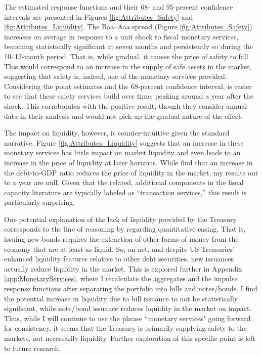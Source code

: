 \documentclass[11pt,a4paper,margin=1.5in]{article}
\begin{document}
The estimated response functions and their 68- and 95-percent confidence intervals are presented in Figures \ref{fig:Attributes_Safety} and \ref{fig:Attributes_Liquidity}.
The Baa--Aaa spread (Figure \ref{fig:Attributes_Safety}) increases on average in response to a unit shock to fiscal monetary services, becoming statistically significant at seven months and persistently so during the 10--12-month period. 
That is, while gradual, it causes the price of safety to fall. 
This would correspond to an increase in the supply of safe assets in the market, suggesting that safety is, indeed, one of the monetary services provided. 
Considering the point estimates and the 68-percent confidence interval, is easier to see that these safety services build over time, peaking around a year after the shock. 
This corroborates with the positive \citet{Krishnamurthy-VissingJorgensen:2012} result, though they consider annual data in their analysis and would not pick up the gradual nature of the effect.

The impact on liquidity, however, is counter-intuitive given the standard narrative.
Figure \ref{fig:Attributes_Liquidity} suggests that an increase in these monetary services has little impact on market liquidity and even leads to an increase in the price of liquidity at later horizons. 
While \citet{Krishnamurthy-VissingJorgensen:2012} find that an increase in the debt-to-GDP ratio reduces the price of liquidity in the market, my results out to a year are null. 
Given that the related, additional components in the fiscal capacity literature \citep[e.g.][]{Brunnermeier-Merkel-Sannikov:2022} are typically labeled as ``transaction services,'' this result is particularly surprising.

One potential explanation of the lack of liquidity provided by the Treasury corresponds to the line of reasoning by \citet{Singh-Stella:2021} regarding quantitative easing.
That is, issuing new bonds requires the extraction of other forms of money from the economy that are at least as liquid.
So, on net, and despite US Treasuries' enhanced liquidity features relative to other debt securities, new issuances actually reduce liquidity in the market.
This is explored further in Appendix \ref{app:MonetaryServices}, where I recalculate the aggregates and the impulse response functions after separating the portfolio into bills and notes/bonds.
I find the potential increase in liquidity due to bill issuance to not be statistically significant, while note/bond issuance reduces liquidity in the market on impact.
Thus, while I will continue to use the phrase ``monetary services" going forward for consistency, it seems that the Treasury is primarily supplying safety to the markets, not necessarily liquidity.
Further exploration of this specific point is left to future research.
\end{document}

